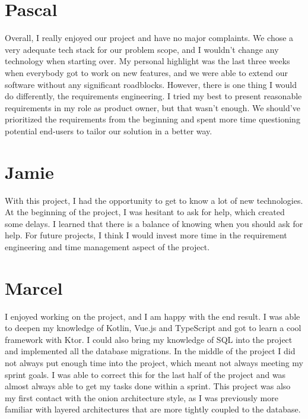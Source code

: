\section{Pascal}
Overall, I really enjoyed our project and have no major complaints.
We chose a very adequate tech stack for our problem scope, and I wouldn't change any technology when starting over.
My personal highlight was the last three weeks when everybody got to work on new features, and we were able to extend our software without any significant roadblocks.
However, there is one thing I would do differently, the requirements engineering.
I tried my best to present reasonable requirements in my role as product owner, but that wasn't enough.
We should've prioritized the requirements from the beginning and spent more time questioning potential end-users to tailor our solution in a better way.

\section{Jamie}
With this project, I had the opportunity to get to know a lot of new technologies. At the beginning of the project, I was hesitant to ask for help, which created some delays.
I learned that there is a balance of knowing when you should ask for help. For future projects, I think I would invest more time in the requirement engineering and time management aspect of the project.

\section{Marcel}
I enjoyed working on the project, and I am happy with the end result. I was able to deepen my knowledge of Kotlin, Vue.js and TypeScript and got to learn a cool framework with Ktor. I could also bring my knowledge of SQL into the project and implemented all the database migrations. In the middle of the project I did not always put enough time into the project, which meant not always meeting my sprint goals. I was able to correct this for the last half of the project and was almost always able to get my tasks done within a sprint. This project was also my first contact with the onion architecture style, as I was previously more familiar with layered architectures that are more tightly coupled to the database.
